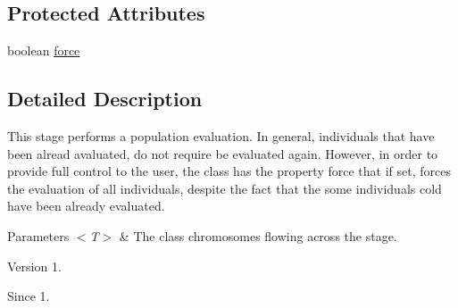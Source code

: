 \subsection*{Protected Attributes}
\begin{DoxyCompactItemize}
\item 
boolean \hyperlink{classjenes_1_1stage_1_1_evaluator_3_01_t_01extends_01_chromosome_01_4_a8ad6c1bcd555e06450a444d2d18b6b89}{force}
\end{DoxyCompactItemize}


\subsection{Detailed Description}
This stage performs a population evaluation. In general, individuals that have been alread avaluated, do not require be evaluated again. However, in order to provide full control to the user, the class has the property {\ttfamily force} that if set, forces the evaluation of all individuals, despite the fact that the some individuals cold have been already evaluated. 


\begin{DoxyParams}{Parameters}
{\em $<$\-T$>$} & The class chromosomes flowing across the stage.\\
\hline
\end{DoxyParams}
\begin{DoxyVersion}{Version}
1. 
\end{DoxyVersion}
\begin{DoxySince}{Since}
1. 
\end{DoxySince}


